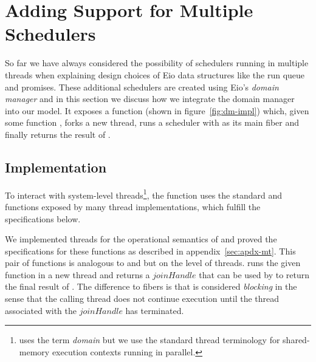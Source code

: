 \section{Adding Support for Multiple Schedulers}
\label{sec:domain-manager}

So far we have always considered the possibility of schedulers running in multiple threads when explaining design choices of Eio data structures like the run queue and promises.
These additional schedulers are created using Eio's \emph{domain manager} and in this section we discuss how we integrate the domain manager into our model.
It exposes a function  (shown in figure~\ref{fig:dm-impl}) which, given some function , forks a new thread, runs a scheduler with  as its main fiber and finally returns the result of .

\subsection{Implementation}
To interact with system-level threads\footnote{\ocf{} uses the term \emph{domain} but we use the standard thread terminology for shared-memory execution contexts running in parallel.},
the function uses the standard  and  functions exposed by many thread implementations, which fulfill the specifications below.
%
We implemented threads for the operational semantics of \hazel{} and proved the specifications for these functions as described in appendix~\ref{sec:apdx-mt}.
This pair of functions is analogous to  and  but on the level of threads.
 runs the given function  in a new thread and returns a \(joinHandle\) that can be used by  to return the final result of .
The difference to fibers is that  is considered \emph{blocking} in the sense that the calling thread does not continue execution until the thread associated with the \(joinHandle\) has terminated.

